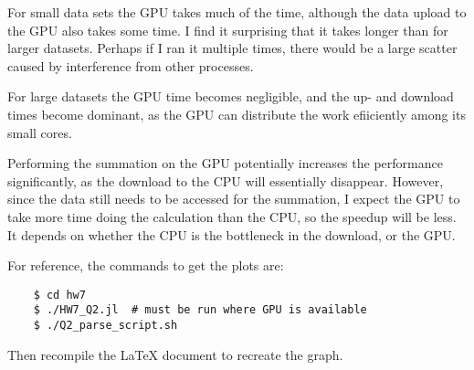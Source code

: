 \documentclass[11pt]{article}
\begin{document}
For small data sets the GPU takes much of the time, although the data upload to
the GPU also takes some time. I find it surprising that it takes longer than
for larger datasets. Perhaps if I ran it multiple times, there would be a large
scatter caused by interference from other processes.

For large datasets the GPU time becomes negligible, and the up- and download
times become dominant, as the GPU can distribute the work efiiciently among its
small cores.

Performing the summation on the GPU potentially increases the performance
significantly, as the download to the CPU will essentially disappear. However,
since the data still needs to be accessed for the summation, I expect the GPU
to take more time doing the calculation than the CPU, so the speedup will be
less. It depends on whether the CPU is the bottleneck in the download, or the
GPU.

For reference, the commands to get the plots are:
\begin{center}
\begin{verbatim}
    $ cd hw7
    $ ./HW7_Q2.jl  # must be run where GPU is available
    $ ./Q2_parse_script.sh
\end{verbatim}
\end{center}
Then recompile the \LaTeX{} document  to recreate the graph.
\end{document}
